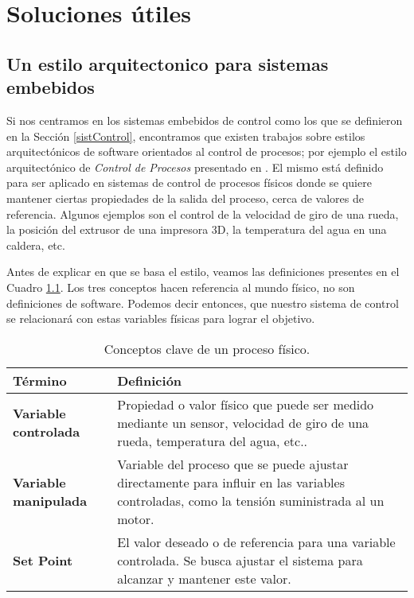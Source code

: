 \chapter{Soluciones útiles}
\label{soluciones}

\section{Un estilo arquitectonico para sistemas embebidos}
\label{arqControlProc}

Si nos centramos en los sistemas embebidos de control como los que se definieron en la Sección \ref{sistControl}, encontramos que existen trabajos sobre estilos arquitectónicos de software orientados al control de procesos; por ejemplo el estilo arquitectónico de \textit{Control de Procesos} presentado en \cite{ShawGarlan1996}. El mismo está definido para ser aplicado en sistemas de control de procesos físicos donde se quiere mantener ciertas propiedades de la salida del proceso, cerca de valores de referencia. Algunos ejemplos son el control de la velocidad de giro de una rueda, la posición del extrusor de una impresora 3D, la temperatura del agua en una caldera, etc.

Antes de explicar en que se basa el estilo, veamos las definiciones presentes en el Cuadro \ref{tab:conceptosArq}. Los tres conceptos hacen referencia al mundo físico, no son definiciones de software. Podemos decir entonces, que nuestro sistema de control se relacionará con estas variables físicas para lograr el objetivo.

\begin{table}[H]

\caption{Conceptos clave de un proceso físico.}
\label{tab:conceptosArq}
\setlength{\extrarowheight}{5pt} %
\renewcommand{\arraystretch}{1.0} %
\begin{tabular}{|>{\raggedright\arraybackslash}p{4.5cm}|>{\raggedright\arraybackslash}p{10.5cm}|}
\hline
\textbf{Término}               & \textbf{Definición}                                                                                                                                       \\ \hline
\textbf{Variable controlada}   & Propiedad o valor físico que puede ser medido mediante un sensor, velocidad de giro de una rueda, temperatura del agua, etc..    \\ \hline
\textbf{Variable manipulada}   & Variable del proceso que se puede ajustar directamente para influir en las variables controladas, como la tensión suministrada al un motor. \\ \hline
\textbf{Set Point}             & El valor deseado o de referencia para una variable controlada. Se busca ajustar el sistema para alcanzar y mantener este valor.                              \\ \hline

\end{tabular}
\end{table}


